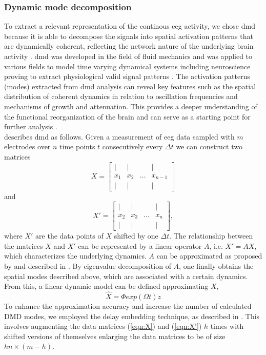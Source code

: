 \subsubsection{Dynamic mode decomposition}
To extract a relevant representation of the continous \gls{eeg} activity, we chose \gls{dmd} because it is able to decompose the signals into spatial activation patterns that are dynamically coherent, reflecting the network nature of the underlying brain activity \cite{Brunton2016}. \Gls{dmd} was developed in the field of fluid mechanics and was applied to various fields to model time varying dynamical systems including neuroscience proving to extract physiological valid signal patterns \cite{Brunton2016, Kunert-Graf2019}. The activation patterns (modes) extracted from \gls{dmd} analysis can reveal key features such as the spatial distribution of coherent dynamics in relation to oscillation frequencies and mechanisms of growth and attenuation. This provides a deeper understanding of the functional reorganization of the brain and can serve as a starting point for further analysis \cite{Brunton2016}.\\
\indent \citeauthor{Brunton2016}\cite{Brunton2016} describes \gls{dmd} as follows. Given a measurement of \gls{eeg} data sampled with $m$ electrodes over $n$ time points $t$ consecutively every $\Delta t$ we can construct two matrices 
\begin{equation}
X = \begin{bmatrix}
    | & | &  & |\\
    x_1 & x_2 & \dots & x_{n-1}\\
    | & | &  & |
\end{bmatrix}
\label{eqn:X}
\end{equation}
and
\begin{equation}
X' = \begin{bmatrix}
    | & | &  & |\\
    x_2 & x_3 & \dots & x_n\\
    | & | &  & |
\end{bmatrix},
\label{eqn:X'}
\end{equation}
where $X'$ are the data points of $X$ shifted by one $\Delta t$. The relationship between the matrices $X$ and $X' $ can be represented by a linear operator $A$, i.e. $X' = AX$, which characterizes the underlying dynamics. $A$ can be approximated as proposed by \cite{Tu2014} and described in \cite{Brunton2016}. By eigenvalue decomposition of $A$, one finally obtains the spatial modes described above, which are associated with a certain dynamics. From this, a linear dynamic model can be defined approximating $X$,
\begin{equation}
    \hat{X}=\Phi exp(\Omega t) z
\end{equation}
To enhance the approximation accuracy and increase the number of calculated DMD modes, we employed the delay embedding technique, as described in \cite{Tu2014,Brunton2016}. This involves augmenting the data matrices (\ref{eqn:X}) and (\ref{eqn:X'}) $h$ times with shifted versions of themselves enlarging the data matrices to be of size $hn \times (m-h)$.  




